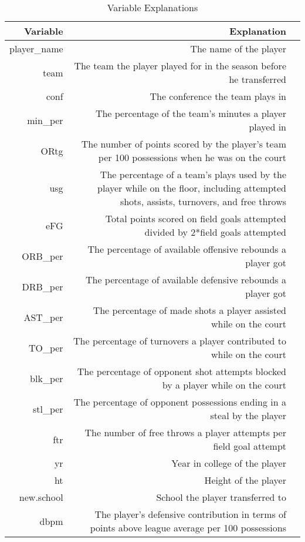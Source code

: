 \documentclass[12pt]{article}
\begin{document}
\begin{table}[tbp]
	\caption{Variable Explanations}
	\label{tab:data_expl}
\centering
\begin{tabular}{rrr}
	\toprule
\textbf{Variable} & \textbf{Explanation} \\
	\midrule
player\_name & The name of the player \\
team & The team the player played for in the season before he transferred \\
conf & The conference the team plays in \\
min\_per & The percentage of the team's minutes a player played in \\
ORtg & The number of points scored by the player's team per 100 possessions when he was on the court \\
usg & The percentage of a team's plays used by the player while on the floor, including attempted shots, assists, turnovers, and free throws \\
eFG & Total points scored on field goals attempted divided by 2*field goals attempted \\
ORB\_per & The percentage of available offensive rebounds a player got \\
DRB\_per & The percentage of available defensive rebounds a player got \\
AST\_per & The percentage of made shots a player assisted while on the court \\
TO\_per & The percentage of turnovers a player contributed to while on the court \\
blk\_per & The percentage of opponent shot attempts blocked by a player while on the court \\
stl\_per & The percentage of opponent possessions ending in a steal by the player \\
ftr & The number of free throws a player attempts per field goal attempt \\
yr & Year in college of the player \\
ht & Height of the player \\
new.school & School the player transferred to \\
dbpm & The player's defensive contribution in terms of points above league average per 100 possessions \\
	\bottomrule
\end{tabular}
\end{table}
\end{document}
